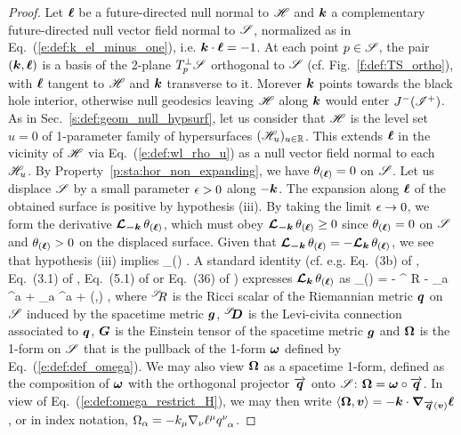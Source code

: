 \begin{proof}
Let $\bm{\ell}$ be a future-directed null normal to $\mathscr{H}$ and $\bm{k}$ a complementary
future-directed null vector field
normal to $\mathscr{S}$, normalized as in Eq.~(\ref{e:def:k_el_minus_one}), i.e.
$\bm{k}\cdot\bm{\ell} = -1$. At each point $p\in \mathscr{S}$, the pair $(\bm{k},\bm{\ell})$ is
a basis of the 2-plane $T_p^\perp\mathscr{S}$ orthogonal to $\mathscr{S}$ (cf. Fig.~\ref{f:def:TS_ortho}),
with $\bm{\ell}$ tangent to $\mathscr{H}$ and $\bm{k}$ transverse to it.
Morever $\bm{k}$ points towards the black hole interior, otherwise null geodesics
leaving $\mathscr{H}$ along $\bm{k}$ would enter $J^-({\mathscr{I}^+})$.
As in Sec.~\ref{s:def:geom_null_hypsurf}, let us consider that $\mathscr{H}$
is the level set $u=0$ of 1-parameter family of hypersurfaces $(\mathscr{H}_u)_{u\in\mathbb{R}}$.
This extends $\bm{\ell}$ in the vicinity of $\mathscr{H}$ via Eq.~(\ref{e:def:wl_rho_u})
as a null vector field normal to each $\mathscr{H}_u$.
By Property~\ref{p:sta:hor_non_expanding}, we have $\theta_{(\bm{\ell})} = 0$
on $\mathscr{S}$. Let us displace $\mathscr{S}$ by a small parameter $\epsilon>0$ along $-\bm{k}$. The expansion along $\bm{\ell}$ of the obtained surface is
positive by hypothesis (iii). By taking the limit $\epsilon\to 0$, we form the
derivative $\bm{\mathcal{L}}_{\bm{-k}}\, \theta_{(\bm{\ell})}$, which must obey
$\bm{\mathcal{L}}_{\bm{-k}}\, \theta_{(\bm{\ell})} \geq 0$ since $\theta_{(\bm{\ell})} = 0$ on $\mathscr{S}$ and
$\theta_{(\bm{\ell})} > 0$ on the displaced surface. Given that
$\bm{\mathcal{L}}_{\bm{-k}}\, \theta_{(\bm{\ell})} = -\bm{\mathcal{L}}_{\bm{k}}\, \theta_{(\bm{\ell})}$, we see that hypothesis
(iii) implies
\be \label{e:sta:Lie_k_l}
     \theta_{(\wl)}  .
\ee
A standard identity (cf. e.g. Eq.~(3b) of \cite{Haywa94}, Eq.~(3.1) of \cite{BoothF07},
Eq.~(5.1) of \cite{Cao11} or Eq.~(36) of \cite{Jaram13})
expresses $\bm{\mathcal{L}}_{\bm{k}}\,\theta_{(\bm{\ell})}$ as
\be \label{e:sta:Lie_k_theta_l}
     \theta_{(\wl)} = -  {}^\Sp\!\! R - \DSc_a \Omega^a
    +  \Omega_a \Omega^a + (\wl,) ,
\ee
where ${}^{\mathscr{S}}\!\! R$ is the Ricci scalar of the Riemannian metric $\bm{q}$ on
$\mathscr{S}$ induced by the spacetime metric $\bm{g}$, ${}^{\mathscr{S}}\!\!\bm{D}$ is the Levi-civita
connection associated to $\bm{q}$,
$\bm{G}$ is the Einstein tensor
of the spacetime metric $\bm{g}$ and $\bm{\Omega}$ is the 1-form on $\mathscr{S}$
that is the pullback of the 1-form $\bm{\omega}$ defined by Eq.~(\ref{e:def:def_omega}).
We may also view $\bm{\Omega}$ as a spacetime 1-form, defined as
the composition of $\bm{\omega}$ with the orthogonal projector $\overrightarrow{\bm{q}}$ onto
$\mathscr{S}$: $\bm{\Omega} = \bm{\omega} \circ \overrightarrow{\bm{q}}$.
In view of Eq.~(\ref{e:def:omega_restrict_H}), we may then write
$\langle\bm{\Omega}, \bm{v} \rangle = - \bm{k} \cdot\bm{\nabla}_{\overrightarrow{\bm{q}}(\bm{v})} \bm{\ell}$,
or in index notation, $\Omega_\alpha  = - k_\mu \nabla_\nu \ell^\mu q^\nu_{\ \, \alpha}$.

\end{proof}
